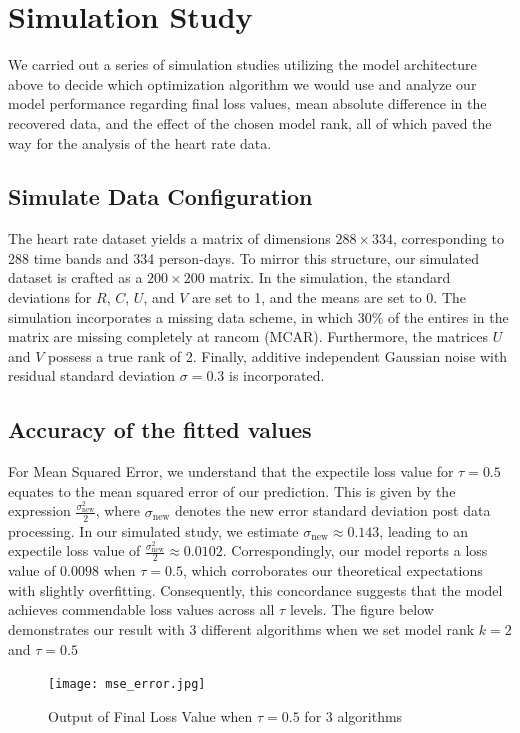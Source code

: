 \documentclass{article}
\begin{document}
\newpage


\section{Simulation Study}
We carried out a series of simulation studies utilizing the model architecture above to decide which optimization algorithm we would use and analyze our model performance regarding final loss values, mean absolute difference in the recovered data, and the effect of the chosen model rank, all of which paved the way for the analysis of the heart rate data.

\subsection{Simulate Data Configuration}
The heart rate dataset yields a matrix of dimensions $288 \times 334$, corresponding to 288 time bands and 334 person-days. To mirror this structure, our simulated dataset is crafted as a $200 \times 200$ matrix. In the simulation, the standard deviations for $R$, $C$, $U$, and $V$ are set to 1, and the means are set to 0. The simulation incorporates a missing data scheme, in which $30\%$ of the entires in the matrix are missing completely at rancom (MCAR). Furthermore, the matrices $U$ and $V$ possess a true rank of 2. Finally, additive independent Gaussian noise with residual standard deviation $\sigma = 0.3$ is incorporated.

\subsection{Accuracy of the fitted values}

For Mean Squared Error, we understand that the expectile loss value for $\tau = 0.5$ equates to the mean squared error of our prediction. This is given by the expression $\displaystyle\frac{\sigma_{\text{new}}^2}{2}$, where $\sigma_{\text{new}}$ denotes the new error standard deviation post data processing. In our simulated study, we estimate $\sigma_{\text{new}} \approx 0.143$, leading to an expectile loss value of $\displaystyle\frac{\sigma_{\text{new}}^2}{2} \approx 0.0102$. Correspondingly, our model reports a loss value of $0.0098$ when $\tau = 0.5$, which corroborates our theoretical expectations with slightly overfitting. Consequently, this concordance suggests that the model achieves commendable loss values across all $\tau$ levels. The figure below demonstrates our result with 3 different algorithms when we set model rank $k = 2$ and $\tau = 0.5$
\begin{figure}[h]
    \centering
    \texttt{[image: mse\_error.jpg]}
    \caption{Output of Final Loss Value when $\tau = 0.5$ for 3 algorithms}
    \label{MSE Error}
\end{figure}
\FloatBarrier
\end{document}

